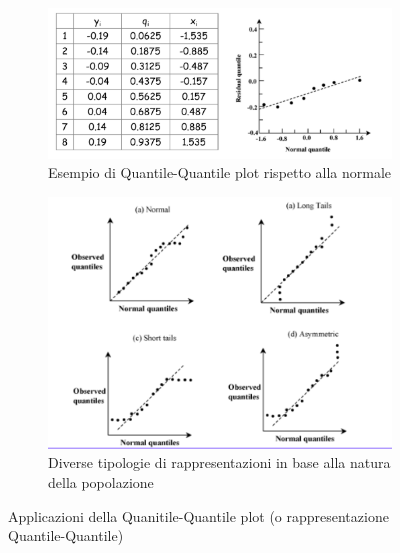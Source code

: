 \begin{figure}[h]

\centering
\begin{subfigure}[b]{0.5\textwidth}
\centering
\includegraphics[width=\textwidth]{img/chapter-4/qqplot-ex.png}
\caption{Esempio di Quantile-Quantile plot rispetto alla normale}\label{img:qqplot-ex}
\end{subfigure}

\hfill

\begin{subfigure}[b]{0.6\textwidth}
\centering
\includegraphics[width=\textwidth]{img/chapter-4/qqplot-confronto.png}
\caption{Diverse tipologie di rappresentazioni in base alla natura della popolazione}\label{img:qqplot-confronto}
\end{subfigure}

\caption{Applicazioni della Quanitile-Quantile plot (o  rappresentazione Quantile-Quantile)}\label{img:qqplot}
\end{figure}

\clearpage
